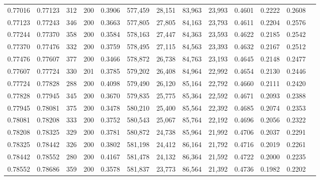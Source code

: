 \begin{tabular}{rrrrrrrrrrrrr}
0.77016 & 0.77123 &    312 & 200 &                                     0.3906 & 577,459 &  28,151 &  83,963 &  23,993 & 0.4601 & 0.2222 & 0.2608 \\
0.77123 & 0.77243 &    346 & 200 &                                     0.3663 & 577,805 &  27,805 &  84,163 &  23,793 & 0.4611 & 0.2204 & 0.2576 \\
0.77244 & 0.77370 &    358 & 200 &                                     0.3584 & 578,163 &  27,447 &  84,363 &  23,593 & 0.4622 & 0.2185 & 0.2542 \\
0.77370 & 0.77476 &    332 & 200 &                                     0.3759 & 578,495 &  27,115 &  84,563 &  23,393 & 0.4632 & 0.2167 & 0.2512 \\
0.77476 & 0.77607 &    377 & 200 &                                     0.3466 & 578,872 &  26,738 &  84,763 &  23,193 & 0.4645 & 0.2148 & 0.2477 \\
0.77607 & 0.77724 &    330 & 201 &                                     0.3785 & 579,202 &  26,408 &  84,964 &  22,992 & 0.4654 & 0.2130 & 0.2446 \\
0.77724 & 0.77828 &    288 & 200 &                                     0.4098 & 579,490 &  26,120 &  85,164 &  22,792 & 0.4660 & 0.2111 & 0.2420 \\
0.77828 & 0.77945 &    345 & 200 &                                     0.3670 & 579,835 &  25,775 &  85,364 &  22,592 & 0.4671 & 0.2093 & 0.2388 \\
0.77945 & 0.78081 &    375 & 200 &                                     0.3478 & 580,210 &  25,400 &  85,564 &  22,392 & 0.4685 & 0.2074 & 0.2353 \\
0.78081 & 0.78208 &    333 & 200 &                                     0.3752 & 580,543 &  25,067 &  85,764 &  22,192 & 0.4696 & 0.2056 & 0.2322 \\
0.78208 & 0.78325 &    329 & 200 &                                     0.3781 & 580,872 &  24,738 &  85,964 &  21,992 & 0.4706 & 0.2037 & 0.2291 \\
0.78325 & 0.78442 &    326 & 200 &                                     0.3802 & 581,198 &  24,412 &  86,164 &  21,792 & 0.4716 & 0.2019 & 0.2261 \\
0.78442 & 0.78552 &    280 & 200 &                                     0.4167 & 581,478 &  24,132 &  86,364 &  21,592 & 0.4722 & 0.2000 & 0.2235 \\
0.78552 & 0.78686 &    359 & 200 &                                     0.3578 & 581,837 &  23,773 &  86,564 &  21,392 & 0.4736 & 0.1982 & 0.2202 \\

\end{tabular}
